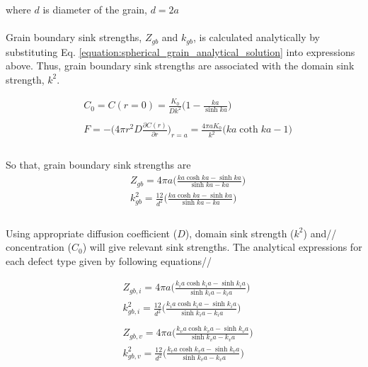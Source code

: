 \documentclass[a4paper]{article}
\begin{document}
    where ${d}$ is diameter of the grain, ${d=2a}$\\\\
    Grain boundary sink strengths, ${Z_{gb}}$ and ${k_{gb}}$, is calculated analytically by substituting Eq.  \ref{equation:spherical_grain_analytical_solution} into expressions above. Thus, grain boundary sink strengths are associated with the domain sink strength, ${k^2}$.\cite{heald1977}

    \begin{equation}
      \begin{aligned}
        &C_0=C(r=0)=\frac{K_0}{Dk^2}\bigg(1-\frac{ka}{\sinh{ka}}\bigg)\\\\
        &F=-\bigg(4\pi r^2D\frac{\partial C(r)}{\partial r}\bigg)_{r=a}=\frac{4\pi aK_0}{k^2}\bigg(ka\coth{ka}-1\bigg)\\
      \end{aligned}
    \end{equation}\\
    So that, grain boundary sink strengths are
    \begin{equation}
      \begin{aligned}
        &Z_{gb}=4\pi a\bigg(\frac{ka\cosh ka-\sinh ka}{\sinh ka-ka}\bigg)\\
        &k^2_{gb}=\frac{12}{d^2}\bigg(\frac{ka\cosh ka-\sinh ka}{\sinh ka-ka}\bigg)\\
      \end{aligned}
    \end{equation}\\

    Using appropriate diffusion coefficient (${D}$), domain sink strength (${k^2}$) and// concentration (${C_0}$) will give  relevant sink strengths. The analytical expressions for each defect type given by following equations//

    \begin{equation}
      \begin{aligned}
        &Z_{gb,i}=4\pi a\bigg(\frac{k_ia\cosh k_ia-\sinh k_ia}{\sinh k_ia-k_ia}\bigg)\\
        &k^2_{gb,i}=\frac{12}{d^2}\bigg(\frac{k_ia\cosh k_ia-\sinh k_ia}{\sinh k_ia-k_ia}\bigg)\\\\
        &Z_{gb,v}=4\pi a\bigg(\frac{k_va\cosh k_va-\sinh k_va}{\sinh k_va-k_va}\bigg)\\
        &k^2_{gb,v}=\frac{12}{d^2}\bigg(\frac{k_va\cosh k_va-\sinh k_va}{\sinh k_va-k_va}\bigg)\\
      \end{aligned}
    \end{equation}\\
\end{document}
